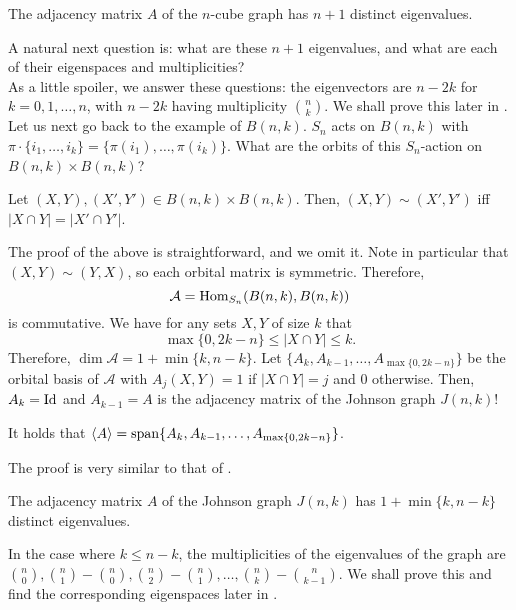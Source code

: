 	\begin{fcor}
		The adjacency matrix $A$ of the $n$-cube graph has $n+1$ distinct eigenvalues.
	\end{fcor}

	A natural next question is: what are these $n+1$ eigenvalues, and what are each of their eigenspaces and multiplicities?\\
	As a little spoiler, we answer these questions: the eigenvectors are $n-2k$ for $k=0,1,\ldots,n$, with $n-2k$ having multiplicity $\binom{n}{k}$. We shall prove this later in . \\

	Let us next go back to the example of $B(n,k)$. $S_n$ acts on $B(n,k)$ with $\pi \cdot \{i_1,\ldots,i_k\} = \{\pi(i_1),\ldots,\pi(i_k)\}$. What are the orbits of this $S_n$-action on $B(n,k) \times B(n,k)$?

	\begin{flem}
		Let $(X,Y), (X',Y') \in B(n,k) \times B(n,k)$. Then, $(X,Y) \sim (X',Y')$ iff $|X \cap Y| = |X' \cap Y'|$.
	\end{flem}
	The proof of the above is straightforward, and we omit it. Note in particular that $(X,Y) \sim (Y,X)$, so each orbital matrix is symmetric. Therefore,
	\[ \mathcal{A} = \operatorname{Hom}_{S_n}(B(n,k),B(n,k)) \]
	is commutative. We have for any sets $X,Y$ of size $k$ that
	\[ \max\{0,2k-n\} \le |X \cap Y| \le k. \]
	Therefore, $\dim \mathcal{A} = 1 + \min\{k,n-k\}$. Let $\{A_k,A_{k-1},\ldots,A_{\max\{0,2k-n\}}\}$ be the orbital basis of $\mathcal{A}$ with $A_j(X,Y) = 1$ if $|X \cap Y| = j$ and $0$ otherwise. Then,$A_k = \operatorname{Id}$ and $A_{k-1} = A$ is the adjacency matrix of the Johnson graph $J(n,k)$!

	\begin{fprop}
		\label{prop: johnson-adj-eigenvals}
		It holds that $\langle A\rangle = \operatorname{span}\{A_k,A_{k-1},\ldots,A_{\max\{0,2k-n\}}\}$.
	\end{fprop}
	The proof is very similar to that of .

	\begin{fcor}
		The adjacency matrix $A$ of the Johnson graph $J(n,k)$ has $1+\min\{k,n-k\}$ distinct eigenvalues.
	\end{fcor}
	In the case where $k \le n-k$, the multiplicities of the eigenvalues of the graph are $\binom{n}{0}, \binom{n}{1} - \binom{n}{0}, \binom{n}{2} - \binom{n}{1}, \ldots, \binom{n}{k}-\binom{n}{k-1}$. We shall prove this and find the corresponding eigenspaces later in .\\

